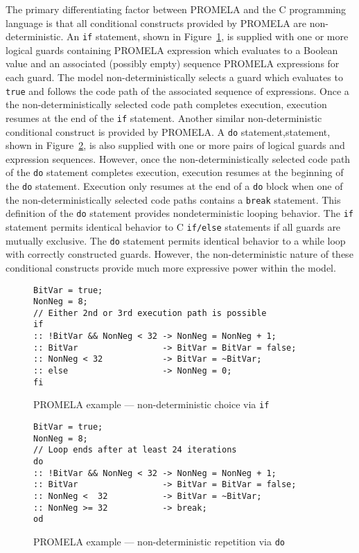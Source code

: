 The primary differentiating factor between PROMELA and the C programming language is that all conditional constructs provided by PROMELA are non-deterministic.
An \texttt{if} statement, shown in Figure\ \ref{fig:choice}, is supplied with one or more logical guards containing PROMELA expression which evaluates to a Boolean value and an associated (possibly empty) sequence PROMELA expressions for each guard.
The model non-deterministically selects a guard which evaluates to \texttt{true} and follows the code path of the associated sequence of expressions.
Once a the non-deterministically selected code path completes execution, execution resumes at the end of the \texttt{if} statement.
Another similar non-deterministic conditional construct is provided by PROMELA.\@
A \texttt{do} statement,statement, shown in Figure\ \ref{fig:repetition}, is also supplied with one or more pairs of logical guards and expression sequences.
However, once the non-deterministically selected code path of the \texttt{do} statement completes execution, execution resumes at the beginning of the \texttt{do} statement.
Execution only resumes at the end of a \texttt{do} block when one of the non-deterministically selected code paths contains a \texttt{break} statement.
This definition of the \texttt{do} statement provides nondeterministic looping behavior.
The \texttt{if} statement permits identical behavior to C \texttt{if/else} statements if all guards are mutually exclusive.
The \texttt{do} statement permits identical behavior to a while loop with correctly constructed guards.
However, the non-deterministic nature of these conditional constructs provide much more expressive power within the model.

\begin{figure}
\centering
\caption{\label{fig:choice}PROMELA example --- non-deterministic choice via \texttt{if}}
\begin{verbatim}
BitVar = true;
NonNeg = 8;
// Either 2nd or 3rd execution path is possible
if
:: !BitVar && NonNeg < 32 -> NonNeg = NonNeg + 1;
:: BitVar                 -> BitVar = BitVar = false;
:: NonNeg < 32            -> BitVar = ~BitVar;
:: else                   -> NonNeg = 0;
fi
\end{verbatim}
\end{figure}


\begin{figure}
\centering
\caption{\label{fig:repetition}PROMELA example --- non-deterministic repetition via \texttt{do}}
\begin{verbatim}
BitVar = true;
NonNeg = 8;
// Loop ends after at least 24 iterations
do
:: !BitVar && NonNeg < 32 -> NonNeg = NonNeg + 1;
:: BitVar                 -> BitVar = BitVar = false;
:: NonNeg <  32           -> BitVar = ~BitVar;
:: NonNeg >= 32           -> break;
od
\end{verbatim}
\end{figure}

